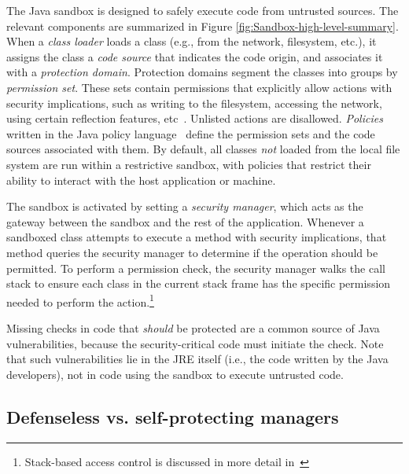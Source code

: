 \documentclass{sig-alternate}
\begin{document}
The Java sandbox is designed to safely execute code from untrusted
sources. 
The relevant components are summarized in Figure
\ref{fig:Sandbox-high-level-summary}. 
When a \textit{class loader} loads a class (e.g., from
the network, filesystem, etc.), it assigns the class a \textit{code source} that
indicates the code origin, and associates it with a \textit{protection
  domain}. Protection domains segment the classes into groups by
\textit{permission set}. These sets
contain permissions that explicitly allow actions with security
implications, such as writing to the filesystem, accessing the network, using
certain reflection features, etc~\cite{_permissions_2014}.  Unlisted actions are disallowed.
\emph{Policies} written in the Java policy
language~\cite{_java_policy_language} define the permission sets and the code
sources associated with them. 
By default, all classes \emph{not} loaded from the local file system are run
within a restrictive sandbox, with policies that restrict their ability to
interact with the host application or machine. 

The sandbox is activated by setting a \emph{security manager}, which acts as the
gateway between the sandbox and the rest of the application. Whenever a
sandboxed class attempts to execute a method with security implications, that
method queries the security manager to determine if the operation should be
permitted. 
To perform a permission check, the security manager walks the call stack to
ensure each class in the current stack frame has the specific permission needed to
perform the action.\footnote{Stack-based access control is discussed in more
  detail
  in~\cite{banerjee_stack-based_2005,besson_stack_2004,d._s._wallach_understanding_1998,erlingsson_irm_2000,fournet_stack_2002}}

Missing checks in code that \emph{should} be protected are a common
source of Java vulnerabilities, because the security-critical code must initiate
the check.  Note that such vulnerabilities lie in the JRE itself (i.e., the code
written by the Java developers), not in code using the sandbox to
execute untrusted code.

\subsection{Defenseless vs. self-protecting managers}
\label{sec:secmanagers}
\end{document}
